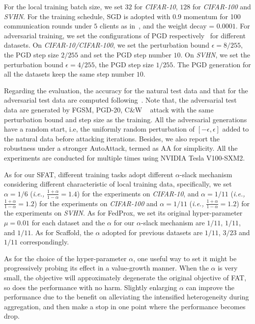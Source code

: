 \documentclass{article} %
\theoremstyle{plain}
\theoremstyle{definition}
\theoremstyle{remark}
\begin{document}
For the local training batch size, we set $32$ for \textit{CIFAR-10}, $128$ for \textit{CIFAR-100} and \textit{SVHN}. For the training schedule, SGD is adopted with 0.9 momentum for 100 communication rounds under $5$ clients as in~\citep{hong2021federated,shah2021adversarial}, and the weight decay = $0.0001$. For adversarial training, we set the configurations of PGD respectively~\citep{Madry_adversarial_training} for different datasets. On \textit{CIFAR-10/CIFAR-100}, we set the perturbation bound $\epsilon = 8/255$, the PGD step size $2/255$ and 
set the PGD step number $10$. On \textit{SVHN}, we set the perturbation bound $\epsilon = 4/255$, the PGD step size $1/255$. The PGD generation for all the datasets keep the same step number $10$.


Regarding the evaluation, the accuracy for the natural test data and that for the adversarial test data are computed following~\citet{Madry_adversarial_training,Zhang_trades}. Note that, the adversarial test data are generated by FGSM, PGD-20, C\&W
~\citep{Carlini017_CW} attack with the same perturbation bound and step size as the training. All the adversarial generations have a random start, i.e, the uniformly random perturbation of $[-\epsilon,\epsilon]$ added to the natural data before attacking iterations. Besides, we also report the robustness under a stronger AutoAttack, termed as AA for simplicity. All the experiments are conducted for multiple times using NVIDIA Tesla V100-SXM2.


As for our SFAT, different training tasks adopt different $\alpha$-slack mechanism considering different characteristic of local training data, specifically, we set $\alpha=1/6$ (\textit{i.e.,} $\frac{1+\alpha}{1-\alpha}=1.4$) for the experiments on \textit{CIFAR-10}, and $\alpha=1/11$ (\textit{i.e.,} $\frac{1+\alpha}{1-\alpha}=1.2$) for the experiments on \textit{CIFAR-100} and $\alpha=1/11$ (\textit{i.e.,} $\frac{1+\alpha}{1-\alpha}=1.2$) for the experiments on \textit{SVHN}. As for FedProx, we set its original hyper-parameter $\mu=0.01$ for each dataset and the $\alpha$ for our $\alpha$-slack mechanism are $1/11$, $1/11$, and $1/11$. As for Scaffold, the $\alpha$ adopted for previous datasets are $1/11$, $3/23$ and $1/11$ correspondingly.

As for the choice of the hyper-parameter $\alpha$, one useful way to set it might be progressively probing its effect in a value-growth manner. When the $\alpha$ is very small, the objective will approximately degenerate the original objective of FAT, so does the performance with no harm. Slightly enlarging $\alpha$ can improve the performance due to the benefit on alleviating the intensified heterogeneity during aggregation, and then make a stop in one point where the performance becomes drop.
\end{document}
